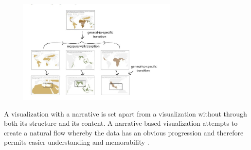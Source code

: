 \documentclass{egpubl}
\begin{document}
\begin{figure}
\begingroup
\centering
\includegraphics[width=8cm]{./images/hullman2013deeper}
\label{fig:hullman2013deeper}
\endgroup
\end{figure}


A visualization with a narrative is set apart from a visualization without through both its structure and its content. A narrative-based visualization attempts to create a natural flow whereby the data has an obvious progression and therefore permits easier understanding and memorability \cite{figueiras}.
\end{document}
